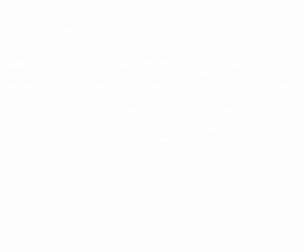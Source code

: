 \documentclass[fontsize=11pt,paper=letter,titlepage,numbers=noenddot,DIV=16]{scrreprt}
\begin{document}
\begin{center}
\end{center}


\textbf{\textcolor{white}{We chose the theme this year as a reflection of the pieces of our environment we harness to create.
An eleMENTAL homage in the form of our collaborative creations as a growing lunar community this year at Spirit Crossing.}} 

\textbf{\textcolor{white}{To The Moon 2018 will embrace all the elements coming together to generate an experience of synergy and expression. The moon controls the tides, the very water which we are blessed to share our space with at Spirit Crossing. 
This year we want to bring more conscious energy to the pristine Clinch River and the access we are lucky to play in.}}

\textbf{\textcolor{white}{The fire experienced at this burn is unequaled and is the reason we gather. We walk upon the earth as stewards of creation and protect the sovereignty with which we were trusted in this spectacular setting at Spirit Crossing.}}

\textbf{\textcolor{white}{The clear air swirls with as us as we dance into the sunrise.}}

\textbf{\textcolor{white}{This weekend will be a complete experience where we touch and shape ourselves and our surroundings with the help of each ELEMENT, reflected within and expressed through us and the art we share. }}

\textbf{\textcolor{white}{``... we are all little MENTAL here.''}}



\cleardoublepage

\tableofcontents

\pagestyle{headings}

\listoftodos


















\end{document}
